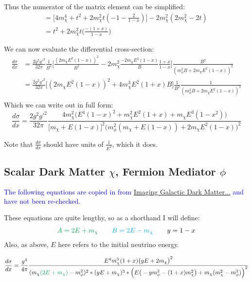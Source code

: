 \documentclass[11pt, oneside]{article}   	%
\begin{document}
Thus the numerator of the matrix element can be simplified:
\begin{align*}
&= \Big[ 4m_\chi^4 + t^2 + 2m_\chi^2 t(-1 - \frac{2}{1-x}) \Big] - 2m_\chi^2(2m_\chi^2 - 2t) \quad \\
&= t^2 + 2m_\chi^2t\Big(\frac{-(1+x)}{1-x}\Big)
\end{align*}

We can now evaluate the differential cross-section: 
\begin{align*}
\frac{d\sigma}{dx} %
&= \frac{2g^2g'^2}{32\pi} \frac{1}{B^2} \Big[ \frac{(2m_\chi E^2(1-x))^2}{B^2} - 2m_\chi^2 \frac{-2m_\chi E^2 (1-x)}{B} \frac{1+x}{1-x} \Big] \frac{B^2}{(m_\phi^2B + 2m_\chi E^2(1-x))^2}\\
&= \frac{2g^2g'^2}{32\pi} \Big[ (2m_\chi E^2(1-x))^2 + 4m_\chi^3 E^2(1+x)B \Big] \frac{1}{B^2} \frac{1}{(m_\phi^2B + 2m_\chi E^2(1-x))^2} \\
\end{align*}
Which we can write out in full form:
\[ \frac{d\sigma}{dx} = \frac{2g^2g'^2}{32\pi}  \frac{ 4m_\chi^2 \Big( E^4(1-x)^2 + m_\chi^2E^2(1+x) + m_\chi E^3(1-x^2) \Big ) }{\Big[ m_\chi + E(1-x) \Big]^2 \Big( m_\phi^2 (m_\chi + E(1-x)) + 2m_\chi E^2 (1-x) \Big)^2} \]

Note that $\frac{d\sigma}{dx}$ should have units of $\frac{1}{E^2}$, which it does. 

\newpage
\subsection{\normalsize Scalar Dark Matter $\chi$, Fermion Mediator $\phi$ }

\textcolor{blue}{The following equations are copied in from \href{https://arxiv.org/pdf/1703.00451.pdf}{Imaging Galactic Dark Matter...} and have not been re-checked.}

These equations are quite lengthy, so as a shorthand I will define:
\[ \textcolor{Green}{A = 2E + m_\chi} \quad \quad \textcolor{cyan}{B = 2E - m_\chi} \quad \quad y = 1-x \]
Also, as above, $E$ here refers to the initial neutrino energy. 

\[ \frac{d\sigma}{dx} = \frac{g^4}{4\pi} \frac{E^4 m_\chi^5 (1+x) \big(yE + 2m_\chi\big)^2}{(m_\chi \textcolor{Green}{(2E + m_\chi)} - m_\phi^2)^2 * (yE + m_\chi)^3 * \Big( E\big(-ym_\phi^2 - (1+x)m_\chi^2\big) + m_\chi(m_\chi^2 - m_\phi^2) \Big)^2 } \]
\end{document}
